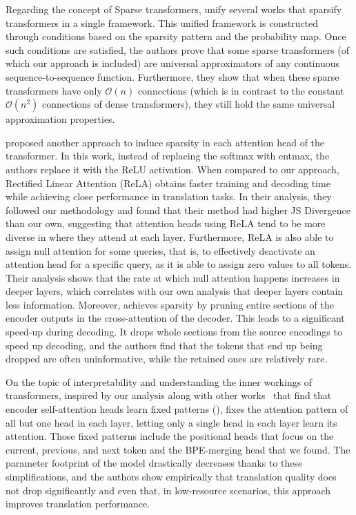 Regarding the concept of Sparse transformers,
\citet{yun2020ConnectionsareExpressive} unify several works that
sparsify transformers in a single framework.
This unified framework is constructed through conditions based on the
sparsity pattern and the probability map. Once such conditions are
satisfied, the authors prove that some sparse transformers (of which
our approach is included) are universal approximators of any
continuous sequence-to-sequence function. Furthermore, they show that
when these sparse transformers have only $\mathcal{O}(n)$ connections (which is
in contrast to the constant $\mathcal{O}(n^2)$ connections of dense
transformers), they still hold the same universal approximation
properties.

\citet{zhang2021SparseAttentionLinear} proposed another approach to
induce sparsity in each attention head of the transformer. In this
work, instead of replacing the softmax with entmax, the authors
replace it with the ReLU activation. When compared to our approach,
Rectified Linear Attention (ReLA) obtains faster training and
decoding time while achieving close performance in translation
tasks. In their analysis, they followed our methodology and found
that their method had higher JS Divergence than our own, suggesting
that attention heads using ReLA tend to be more diverse in where they
attend at each layer. Furthermore, ReLA is also able to assign null
attention for some queries, that is, to effectively deactivate an
attention head for a specific query, as it is able to assign zero
values to all tokens. Their analysis shows that the rate at which
null attention happens increases in deeper layers, which correlates
with our own analysis that deeper layers contain less information.
Moreover, \citet{zhang2021SparsifyingEncoderOutputs} achieves
sparsity by pruning entire sections of the encoder outputs in the
cross-attention of the decoder. This leads to a significant speed-up
during decoding. It drops whole sections from the source encodings to
speed up decoding, and the authors find that the tokens that end up
being dropped are often uninformative, while the retained ones
are relatively rare.

On the topic of interpretability and understanding the inner workings
of transformers, inspired by our analysis along with other
works~\citep{specialized} that find that
encoder self-attention heads learn fixed patterns
(), \citet{raganato2020FixedEncoderSelfAttention}
fixes the attention pattern of all but one head in each layer,
letting only a single head in each layer learn its attention. Those
fixed patterns include the positional heads that focus on the
current, previous, and next token and the BPE-merging head that we
found. The parameter footprint of the model drastically decreases
thanks to these simplifications, and the authors show empirically
that translation quality does not drop significantly and even that,
in low-resource scenarios, this approach improves translation
performance.

